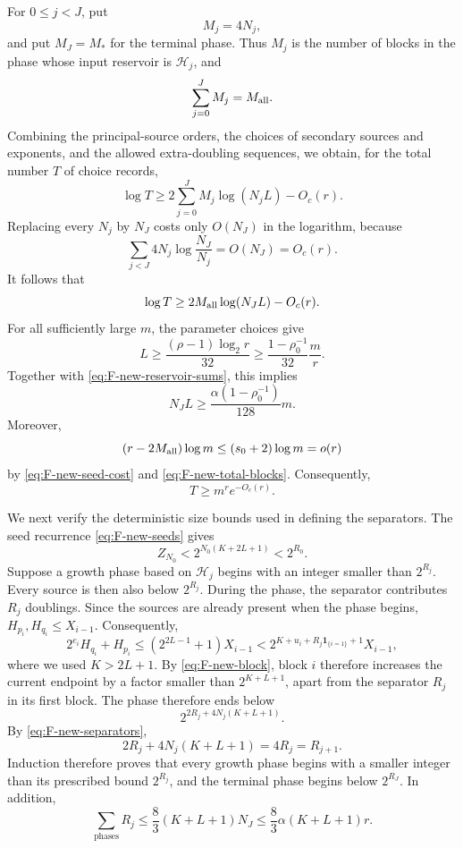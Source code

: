 \documentclass{article}
\theoremstyle{definition}
\begin{document}
For $0\leq j<J$, put
$$
 M_j=4N_j,
$$
and put $M_J=M_*$ for the terminal phase.  Thus $M_j$ is the number of
blocks in the phase whose input reservoir is $\mathcal H_j$, and
$$
 \sum_{j=0}^J M_j=M_{\rm all}.
$$
Combining the principal-source orders, the choices of secondary sources and
exponents, and the allowed extra-doubling sequences, we obtain, for the
total number $T$ of choice records,
$$
 \log T
 \geq
 2\sum_{j=0}^J M_j\log(N_jL)-O_c(r).
$$
Replacing every $N_j$ by $N_J$ costs only $O(N_J)$ in the logarithm, because
$$
 \sum_{j<J}4N_j\log\frac{N_J}{N_j}=O(N_J)=O_c(r).
$$
It follows that
$$
 \log T\geq2M_{\rm all}\log(N_JL)-O_c(r).
$$
For all sufficiently large $m$, the parameter choices give
$$
L\ge\frac{(\rho-1)\log_2r}{32}
\ge\frac{1-\rho_0^{-1}}{32}\frac mr.
$$
Together with \eqref{eq:F-new-reservoir-sums}, this implies
$$
N_JL\ge\frac{\alpha(1-\rho_0^{-1})}{128}m.
$$ Moreover,
$$
 (r-2M_{\rm all})\log m
 \leq(s_0+2)\log m=o(r)
$$
by \eqref{eq:F-new-seed-cost} and \eqref{eq:F-new-total-blocks}.
Consequently,
\begin{equation}
 T\geq m^re^{-O_c(r)}.
 \label{eq:F-new-T}
\end{equation}

We next verify the deterministic size bounds used in defining the separators.
The seed recurrence \eqref{eq:F-new-seeds} gives
$$
 Z_{N_0}<2^{N_0(K+2L+1)}<2^{R_0}.
$$
Suppose a growth phase based on $\mathcal H_j$ begins with an integer smaller than $2^{R_j}$.
Every source is then also below $2^{R_j}$.  During the phase, the separator
contributes $R_j$ doublings.  Since the sources are already present when the
phase begins, $H_{p_i},H_{q_i}\leq X_{i-1}$.  Consequently,
$$
 2^{e_i}H_{q_i}+H_{p_i}
 \leq(2^{2L-1}+1)X_{i-1}
 <2^{K+u_i+R_j\mathbf 1_{\{i=1\}}+1}X_{i-1},
$$
where we used $K>2L+1$.  By \eqref{eq:F-new-block}, block $i$ therefore
increases the current endpoint by a factor smaller than $2^{K+L+1}$, apart
from the separator $R_j$ in its first block.  The phase therefore ends below
$$
 2^{2R_j+4N_j(K+L+1)}.
$$
By \eqref{eq:F-new-separators},
$$
 2R_j+4N_j(K+L+1)=4R_j=R_{j+1}.
$$
Induction therefore proves that every growth phase begins with a smaller integer than its prescribed
bound $2^{R_j}$, and the terminal phase begins below $2^{R_J}$.  In addition,
\begin{equation}
 \sum_{\text{phases}}R_j
 \leq\frac83(K+L+1)N_J
 \leq\frac83\alpha(K+L+1)r.
 \label{eq:F-new-separator-total}
\end{equation}
\end{document}
